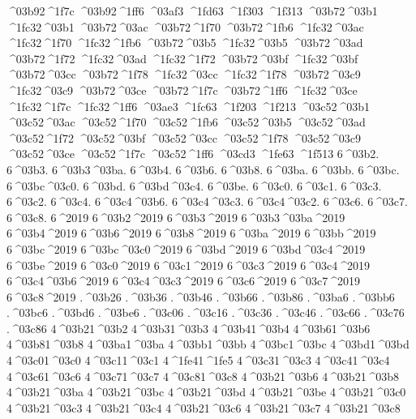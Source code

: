 {^^^^03b92^^^^1f7c
^^^^03b92^^^^1ff6
^^^^03af3
^^^^1fd63
^^^^1f303
^^^^1f313
^^^^03b72^^^^03b1
^^^^1fc32^^^^03b1
^^^^03b72^^^^03ac
^^^^03b72^^^^1f70
^^^^03b72^^^^1fb6
^^^^1fc32^^^^03ac
^^^^1fc32^^^^1f70
^^^^1fc32^^^^1fb6
^^^^03b72^^^^03b5
^^^^1fc32^^^^03b5
^^^^03b72^^^^03ad
^^^^03b72^^^^1f72
^^^^1fc32^^^^03ad
^^^^1fc32^^^^1f72
^^^^03b72^^^^03bf
^^^^1fc32^^^^03bf
^^^^03b72^^^^03cc
^^^^03b72^^^^1f78
^^^^1fc32^^^^03cc
^^^^1fc32^^^^1f78
^^^^03b72^^^^03c9
^^^^1fc32^^^^03c9
^^^^03b72^^^^03ce
^^^^03b72^^^^1f7c
^^^^03b72^^^^1ff6
^^^^1fc32^^^^03ce
^^^^1fc32^^^^1f7c
^^^^1fc32^^^^1ff6
^^^^03ae3
^^^^1fc63
^^^^1f203
^^^^1f213
^^^^03c52^^^^03b1
^^^^03c52^^^^03ac
^^^^03c52^^^^1f70
^^^^03c52^^^^1fb6
^^^^03c52^^^^03b5
^^^^03c52^^^^03ad
^^^^03c52^^^^1f72
^^^^03c52^^^^03bf
^^^^03c52^^^^03cc
^^^^03c52^^^^1f78
^^^^03c52^^^^03c9
^^^^03c52^^^^03ce
^^^^03c52^^^^1f7c
^^^^03c52^^^^1ff6
^^^^03cd3
^^^^1fe63
^^^^1f513
6^^^^03b2.
6^^^^03b3.
6^^^^03b3^^^^03ba.
6^^^^03b4.
6^^^^03b6.
6^^^^03b8.
6^^^^03ba.
6^^^^03bb.
6^^^^03bc.
6^^^^03bc^^^^03c0.
6^^^^03bd.
6^^^^03bd^^^^03c4.
6^^^^03be.
6^^^^03c0.
6^^^^03c1.
6^^^^03c3.
6^^^^03c2.
6^^^^03c4.
6^^^^03c4^^^^03b6.
6^^^^03c4^^^^03c3.
6^^^^03c4^^^^03c2.
6^^^^03c6.
6^^^^03c7.
6^^^^03c8.
6^^^^2019
6^^^^03b2^^^^2019
6^^^^03b3^^^^2019
6^^^^03b3^^^^03ba^^^^2019
6^^^^03b4^^^^2019
6^^^^03b6^^^^2019
6^^^^03b8^^^^2019
6^^^^03ba^^^^2019
6^^^^03bb^^^^2019
6^^^^03bc^^^^2019
6^^^^03bc^^^^03c0^^^^2019
6^^^^03bd^^^^2019
6^^^^03bd^^^^03c4^^^^2019
6^^^^03be^^^^2019
6^^^^03c0^^^^2019
6^^^^03c1^^^^2019
6^^^^03c3^^^^2019
6^^^^03c4^^^^2019
6^^^^03c4^^^^03b6^^^^2019
6^^^^03c4^^^^03c3^^^^2019
6^^^^03c6^^^^2019
6^^^^03c7^^^^2019
6^^^^03c8^^^^2019
.^^^^03b26
.^^^^03b36
.^^^^03b46
.^^^^03b66
.^^^^03b86
.^^^^03ba6
.^^^^03bb6
.^^^^03bc6
.^^^^03bd6
.^^^^03be6
.^^^^03c06
.^^^^03c16
.^^^^03c36
.^^^^03c46
.^^^^03c66
.^^^^03c76
.^^^^03c86
4^^^^03b21^^^^03b2
4^^^^03b31^^^^03b3
4^^^^03b41^^^^03b4
4^^^^03b61^^^^03b6
4^^^^03b81^^^^03b8
4^^^^03ba1^^^^03ba
4^^^^03bb1^^^^03bb
4^^^^03bc1^^^^03bc
4^^^^03bd1^^^^03bd
4^^^^03c01^^^^03c0
4^^^^03c11^^^^03c1
4^^^^1fe41^^^^1fe5
4^^^^03c31^^^^03c3
4^^^^03c41^^^^03c4
4^^^^03c61^^^^03c6
4^^^^03c71^^^^03c7
4^^^^03c81^^^^03c8
4^^^^03b21^^^^03b6
4^^^^03b21^^^^03b8
4^^^^03b21^^^^03ba
4^^^^03b21^^^^03bc
4^^^^03b21^^^^03bd
4^^^^03b21^^^^03be
4^^^^03b21^^^^03c0
4^^^^03b21^^^^03c3
4^^^^03b21^^^^03c4
4^^^^03b21^^^^03c6
4^^^^03b21^^^^03c7
4^^^^03b21^^^^03c8
}
